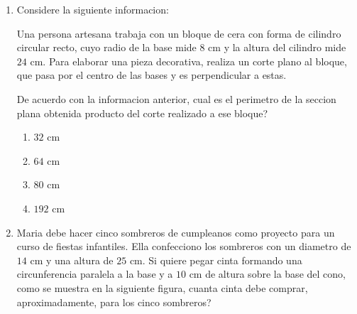 \documentclass[12pt]{article}
\begin{document}
\begin{enumerate}[label=\textbf{\arabic*.}, itemsep=1.1cm]
\begin{enumerate}[label=\Alph*)]
  \item circunferencia.
  \item hiperbola.
  \item parabola.
  \item recta.
\end{enumerate}

\Needspace{0.48\textheight}
\item
Considere la siguiente informacion:

Una persona artesana trabaja con un bloque de cera con forma de cilindro circular recto, cuyo radio de la base mide $8$ cm y la altura del cilindro mide $24$ cm. Para elaborar una pieza decorativa, realiza un corte plano al bloque, que pasa por el centro de las bases y es perpendicular a estas.

De acuerdo con la informacion anterior, \textquestiondown cual es el perimetro de la seccion plana obtenida producto del corte realizado a ese bloque?

\begin{enumerate}[label=\Alph*)]
  \item $32$ cm
  \item $64$ cm
  \item $80$ cm
  \item $192$ cm
\end{enumerate}

\Needspace{0.78\textheight}
\item
Maria debe hacer cinco sombreros de cumpleanos como proyecto para un curso de fiestas infantiles. Ella confecciono los sombreros con un diametro de $14$ cm y una altura de $25$ cm. Si quiere pegar cinta formando una circunferencia paralela a la base y a $10$ cm de altura sobre la base del cono, como se muestra en la siguiente figura, \textquestiondown cuanta cinta debe comprar, aproximadamente, para los cinco sombreros?

\begin{center}
\end{center}


\end{enumerate}
\end{document}
